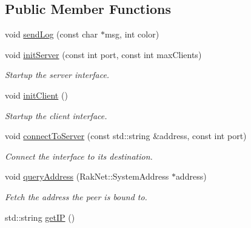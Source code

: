 \subsection*{Public Member Functions}
\begin{DoxyCompactItemize}
\item 
void \hyperlink{class_champ_net_1_1_network_a3d25e6581e6a53201de1f68ed266724e}{send\-Log} (const char $\ast$msg, int color)
\item 
\hypertarget{class_champ_net_1_1_network_ac0d53751c94ef1df4cee9ce3719432bf}{void \hyperlink{class_champ_net_1_1_network_ac0d53751c94ef1df4cee9ce3719432bf}{init\-Server} (const int port, const int max\-Clients)}\label{class_champ_net_1_1_network_ac0d53751c94ef1df4cee9ce3719432bf}

\begin{DoxyCompactList}\small\item\em Startup the server interface. \end{DoxyCompactList}\item 
\hypertarget{class_champ_net_1_1_network_af7bda654a247a00e46d6adcc87c8d65b}{void \hyperlink{class_champ_net_1_1_network_af7bda654a247a00e46d6adcc87c8d65b}{init\-Client} ()}\label{class_champ_net_1_1_network_af7bda654a247a00e46d6adcc87c8d65b}

\begin{DoxyCompactList}\small\item\em Startup the client interface. \end{DoxyCompactList}\item 
\hypertarget{class_champ_net_1_1_network_a9dbfd1e6e9e5f11720a6e8e41174df1e}{void \hyperlink{class_champ_net_1_1_network_a9dbfd1e6e9e5f11720a6e8e41174df1e}{connect\-To\-Server} (const std\-::string \&address, const int port)}\label{class_champ_net_1_1_network_a9dbfd1e6e9e5f11720a6e8e41174df1e}

\begin{DoxyCompactList}\small\item\em Connect the interface to its destination. \end{DoxyCompactList}\item 
\hypertarget{class_champ_net_1_1_network_a9cde161aafa694e5fef8d1c3fac3edd3}{void \hyperlink{class_champ_net_1_1_network_a9cde161aafa694e5fef8d1c3fac3edd3}{query\-Address} (Rak\-Net\-::\-System\-Address $\ast$address)}\label{class_champ_net_1_1_network_a9cde161aafa694e5fef8d1c3fac3edd3}

\begin{DoxyCompactList}\small\item\em Fetch the address the peer is bound to. \end{DoxyCompactList}\item 
\hypertarget{class_champ_net_1_1_network_a29734a6ba6ab488fc9ed9278ae7239d9}{std\-::string \hyperlink{class_champ_net_1_1_network_a29734a6ba6ab488fc9ed9278ae7239d9}{get\-I\-P} ()}\label{class_champ_net_1_1_network_a29734a6ba6ab488fc9ed9278ae7239d9}


\end{DoxyCompactItemize}
